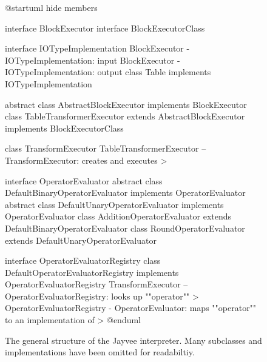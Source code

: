 \begin{figure}
	\begin{plantuml}
		@startuml
		hide members

		interface BlockExecutor
		interface BlockExecutorClass

		interface IOTypeImplementation
		BlockExecutor  -  IOTypeImplementation: input
		BlockExecutor - IOTypeImplementation: output
		class Table implements IOTypeImplementation

		abstract class AbstractBlockExecutor implements BlockExecutor
		class TableTransformerExecutor extends AbstractBlockExecutor implements BlockExecutorClass

		class TransformExecutor
		TableTransformerExecutor -- TransformExecutor: creates and executes >

		interface OperatorEvaluator
		abstract class DefaultBinaryOperatorEvaluator implements OperatorEvaluator
		abstract class DefaultUnaryOperatorEvaluator implements OperatorEvaluator
		class AdditionOperatorEvaluator extends DefaultBinaryOperatorEvaluator
		class RoundOperatorEvaluator extends DefaultUnaryOperatorEvaluator

		interface OperatorEvaluatorRegistry
		class DefaultOperatorEvaluatorRegistry implements OperatorEvaluatorRegistry
		TransformExecutor -- OperatorEvaluatorRegistry: looks up ""operator"" >
		OperatorEvaluatorRegistry - OperatorEvaluator: maps ""operator"" to an implementation of >
		@enduml
	\end{plantuml}
	\caption{The general structure of the Jayvee interpreter. Many subclasses and implementations have been omitted for readabiltiy.}
	\label{fig:uml:overview}
\end{figure}


